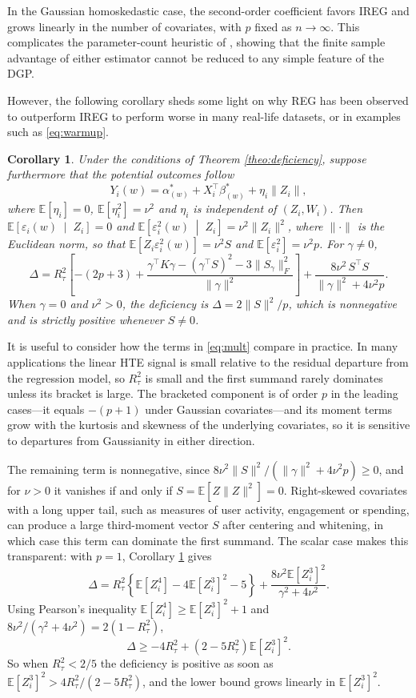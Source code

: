\documentclass{article}
\newcommand{\EEE}{\mathbb{E}}
\newcommand{\EE}[1]{\mathbb{E}\left[#1\right]}
\newcommand{\cb}[1]{\left\{#1\right\}}
\newcommand{\cond}{\;\middle|\;}
\theoremstyle{plain}
\newtheorem{coro}[prop]{Corollary}
\theoremstyle{definition}
\theoremstyle{remark}
\begin{document}
In the Gaussian homoskedastic case, the second-order coefficient favors IREG and grows linearly in the number of covariates, with $p$ fixed as $n\to\infty$. This complicates the parameter-count heuristic of \citet{zhao2023covariate}, showing that the finite sample advantage of either estimator cannot be reduced to any simple feature of the DGP.

However, the following corollary sheds some light on why REG has been observed to outperform IREG to perform worse in many real-life datasets, or in examples such as \eqref{eq:warmup}.

\begin{coro}
\label{coro:mult_normproportional}
Under the conditions of Theorem \ref{theo:deficiency}, suppose furthermore that the potential outcomes follow
\[
Y_i(w) = \alpha^*_{(w)} + X_i^\top\beta^*_{(w)} + \eta_i\|Z_i\|,
\]
where $\EE{\eta_i}=0$, $\EE{\eta_i^2}=\nu^2$ and $\eta_i$ is independent of $(Z_i,W_i)$. Then $\EE{\varepsilon_i(w)\cond Z_i}=0$ and $\EE{\varepsilon_i^2(w)\cond Z_i}=\nu^2\|Z_i\|^2$, where $\|\cdot\|$ is the Euclidean norm, so that $\EE{Z_i\varepsilon_i^2(w)}=\nu^2S$ and $\EE{\varepsilon_i^2}=\nu^2p$. For $\gamma\neq0$,
\begin{equation}
\label{eq:mult}
\Delta
=
R_\tau^2
\left[
-(2p+3)
+
\frac{\gamma^\top K\gamma-(\gamma^\top S)^2-3\|S_\gamma\|_F^2}{\|\gamma\|^2}
\right]
+
\frac{8\nu^2\,S^\top S}{\|\gamma\|^2+4\nu^2 p}.
\end{equation}
When $\gamma=0$ and $\nu^2>0$, the deficiency is
$\Delta=2\|S\|^2/p$, which is nonnegative and is strictly
positive whenever $S\neq0$.
\end{coro}


It is useful to consider how the terms in \eqref{eq:mult} compare in practice. In many applications the linear HTE signal is small relative to the residual departure from the regression model, so $R_\tau^2$ is small and the first summand rarely dominates unless its bracket is large. The bracketed component is of order $p$ in the leading cases---it equals $-(p+1)$ under Gaussian covariates---and its moment terms grow with the kurtosis and skewness of the underlying covariates, so it is sensitive to departures from Gaussianity in either direction.

The remaining term is nonnegative, since $8\nu^2\|S\|^2/(\|\gamma\|^2+4\nu^2p)\geq0$, and for $\nu>0$ it vanishes if and only if $S=\EEE[Z\|Z\|^2]=0$. Right-skewed covariates with a long upper tail, such as measures of user activity, engagement or spending, can produce a large third-moment vector $S$ after centering and whitening, in which case this term can dominate the first summand. The scalar case makes this transparent: with $p=1$, Corollary \ref{coro:mult_normproportional} gives
\[
\Delta
=
R_\tau^2\cb{\EE{Z_i^4}-4\EE{Z_i^3}^2-5}
+
\frac{8\nu^2\EE{Z_i^3}^2}{\gamma^2+4\nu^2}.
\]
Using Pearson's inequality $\EE{Z_i^4}\geq \EE{Z_i^3}^2+1$ \citep[see, e.g.,][]{rohatgi1989sharp} and $8\nu^2/(\gamma^2+4\nu^2) = 2(1-R^2_\tau)$,
\[
\Delta
\geq
-4R_\tau^2 + (2-5R_\tau^2)\EE{Z_i^3}^2 .
\]
So when $R_\tau^2 < 2/5$ the deficiency is positive as soon as $\EE{Z_i^3}^2 > 4R^2_\tau/(2-5R^2_\tau)$, and the lower bound grows linearly in $\EE{Z_i^3}^2$. 
\end{document}
